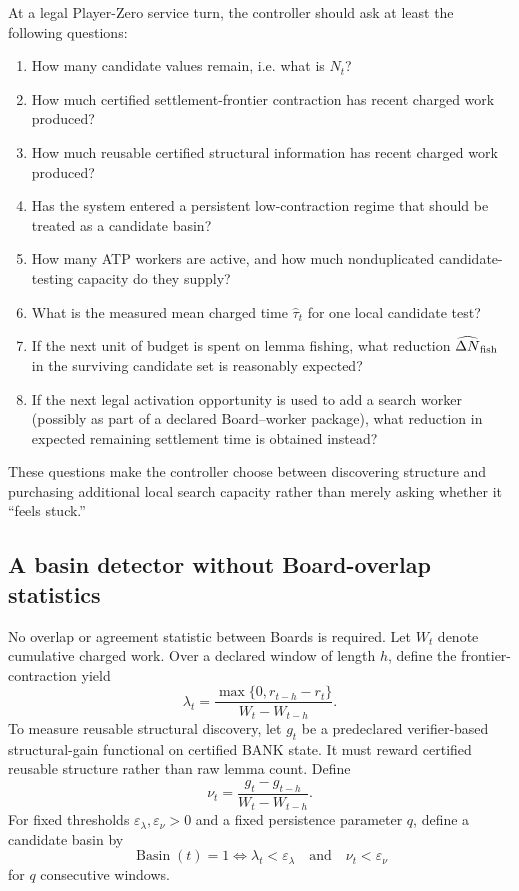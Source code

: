 \documentclass[11pt]{article}
\theoremstyle{definition}
\begin{document}
At a legal Player-Zero service turn, the controller should ask at least the following questions:
\begin{enumerate}[label=(\arabic*)]
\item How many candidate values remain, i.e. what is $N_t$?
\item How much certified settlement-frontier contraction has recent charged work produced?
\item How much reusable certified structural information has recent charged work produced?
\item Has the system entered a persistent low-contraction regime that should be treated as a candidate basin?
\item How many ATP workers are active, and how much nonduplicated candidate-testing capacity do they supply?
\item What is the measured mean charged time $\widehat\tau_t$ for one local candidate test?
\item If the next unit of budget is spent on lemma fishing, what reduction $\widehat{\Delta N}_{\rm fish}$ in the surviving candidate set is reasonably expected?
\item If the next legal activation opportunity is used to add a search worker (possibly as part of a declared Board--worker package), what reduction in expected remaining settlement time is obtained instead?
\end{enumerate}
These questions make the controller choose between discovering structure and purchasing additional local search capacity rather than merely asking whether it ``feels stuck.''

\subsection{A basin detector without Board-overlap statistics}

No overlap or agreement statistic between Boards is required. Let $W_t$ denote cumulative charged work. Over a declared window of length $h$, define the frontier-contraction yield
\[
\lambda_t=
\frac{\max\{0,r_{t-h}-r_t\}}
     {W_t-W_{t-h}}.
\]
To measure reusable structural discovery, let $g_t$ be a predeclared verifier-based structural-gain functional on certified BANK state. It must reward certified reusable structure rather than raw lemma count. Define
\[
\nu_t=
\frac{g_t-g_{t-h}}
     {W_t-W_{t-h}}.
\]
For fixed thresholds $\varepsilon_\lambda,\varepsilon_\nu>0$ and a fixed persistence parameter $q$, define a candidate basin by
\[
\boxed{
\operatorname{Basin}(t)=1
\iff
\lambda_t<\varepsilon_\lambda
\quad\text{and}\quad
\nu_t<\varepsilon_\nu
}
\]
for $q$ consecutive windows.
\end{document}
